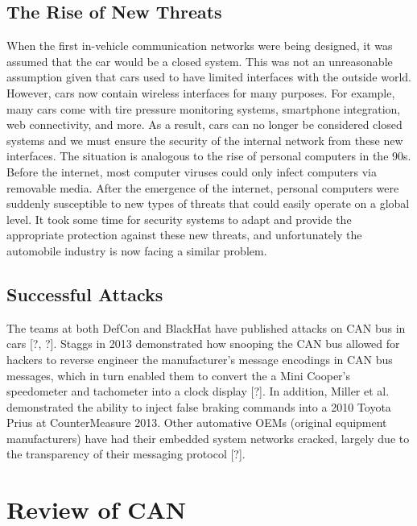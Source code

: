 \documentclass{article}
\begin{document}
    \subsection{The Rise of New Threats}
    When the first in-vehicle communication networks were being designed, it was assumed that the car would be a closed system. This was not an unreasonable assumption given that cars used to have limited interfaces with the outside world. However, cars now contain wireless interfaces for many purposes. For example, many cars come with tire pressure monitoring systems, smartphone integration, web connectivity, and more. As a result, cars can no longer be considered closed systems and we must ensure the security of the internal network from these new interfaces. The situation is analogous to the rise of personal computers in the 90s. Before the internet, most computer viruses could only infect computers via removable media. After the emergence of the internet, personal computers were suddenly susceptible to new types of threats that could easily operate on a global level. It took some time for security systems to adapt and provide the appropriate protection against these new threats, and unfortunately the automobile industry is now facing a similar problem.
    
    \subsection{Successful Attacks}
    The teams at both DefCon and BlackHat have published attacks on CAN bus in cars [?, ?]. Staggs in 2013 demonstrated how snooping the CAN bus allowed for hackers to reverse engineer the manufacturer's message encodings in CAN bus messages, which in turn enabled them to convert the a Mini Cooper's speedometer and tachometer into a clock display [?]. In addition, Miller et al. demonstrated the ability to inject false braking commands into a 2010 Toyota Prius at CounterMeasure 2013. Other automative OEMs (original equipment manufacturers) have had their embedded system networks cracked, largely due to the transparency of their messaging protocol [?].
    
    
\section{Review of CAN}
\end{document}
